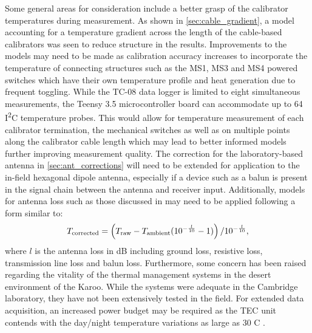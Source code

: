Some general areas for consideration include a better grasp of the calibrator temperatures during measurement. As shown in \cref{sec:cable_gradient}, a model accounting for a temperature gradient across the length of the cable-based calibrators was seen to reduce structure in the results. Improvements to the models may need to be made as calibration accuracy increases to incorporate the temperature of connecting structures such as the MS1, MS3 and MS4 powered switches which have their own temperature profile and heat generation due to frequent toggling. While the TC-08 data logger is limited to eight simultaneous measurements, the Teensy 3.5 microcontroller board can accommodate up to 64 I\textsuperscript{2}C temperature probes. This would allow for temperature measurement of each calibrator termination, the mechanical switches as well as on multiple points along the calibrator cable length which may lead to better informed models further improving measurement quality. The correction for the laboratory-based antenna in \cref{sec:ant_corrections} will need to be extended for application to the in-field hexagonal dipole antenna, especially if a device such as a balun is present in the signal chain between the antenna and receiver input. Additionally, models for antenna loss such as those discussed in \citet{rogersCal} may need to be applied following a form similar to:
\begin{equation}
    T_{\mathrm{corrected}} = \left( T_{\mathrm{raw}} - T_{\mathrm{ambient}}(10^{-\frac{l}{10}} - 1) \right) / 10^{-\frac{l}{10}}, 
    \label{eqn:ant_loss}
\end{equation}
where $l$ is the antenna loss in dB including ground loss, resistive loss, transmission line loss and balun loss. Furthermore, some concern has been raised regarding the vitality of the thermal management systems in the desert environment of the Karoo. While the systems were adequate in the Cambridge laboratory, they have not been extensively tested in the field. For extended data acquisition, an increased power budget may be required as the TEC unit contends with the day/night temperature variations as large as 30 \textdegree C \citep{karoo_temp}.

